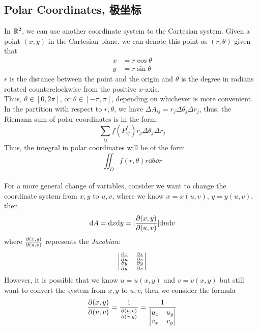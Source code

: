 \subsection{Polar Coordinates, 极坐标}
In $\mathbb{R}^2$, we can use another coordinate system to the Cartesian system. Given a point $(x, y)$ in the Cartesian plane, we can denote this point as $(r, \theta)$ given that
\begin{align*}
    x &= r \cos{\theta} \\
    y &= r \sin{\theta}
\end{align*}
$r$ is the distance between the point and the origin and $\theta$ is the degree in radians rotated counterclockwise from the positive $x$-axis. \\
Thus, $\theta \in [0, 2 \pi]$, or $\theta \in [-\pi, \pi]$, depending on whichever is more convenient. \\
In the partition with respect to $r, \theta$, we have $\Delta A_{ij} = r_j \Delta \theta_j \Delta r_j$, thus, the Riemann sum of polar coordinates is in the form:
$$\sum_{ij} f(P_{ij}^{*}) r_j \Delta \theta_j \Delta r_j$$
Thus, the integral in polar coordinates will be of the form
$$\iint_D f(r, \theta)r \dd \theta \dd r$$
\\
For a more general change of variables, consider we want to change the coordinate system from $x, y$ to $u, v$, where we know $x = x(u, v)$, $y = y(u, v)$, then
$$\dd A = \dd x \dd y = |\pdv{(x, y)}{(u, v)}|\dd u \dd v$$
where $\pdv{(x, y)}{(u, v)}$ represents the \textit{Jacobian}: 
$$\begin{vmatrix}
    \pdv{x}{u} & \pdv{x}{v} \\
    \pdv{y}{u} & \pdv{y}{v}
\end{vmatrix}$$
However, it is possible that we know $u = u(x, y)$ and $v = v(x, y)$ but still want to convert the system from $x, y$ to $u, v$, then we consider the formula
$$\pdv{(x, y)}{(u, v)} = \frac{1}{\pdv{(u, v)}{(x, y)}} = \frac{1}{\begin{vmatrix}
    u_x & u_y \\
    v_x & v_y
\end{vmatrix}}$$

